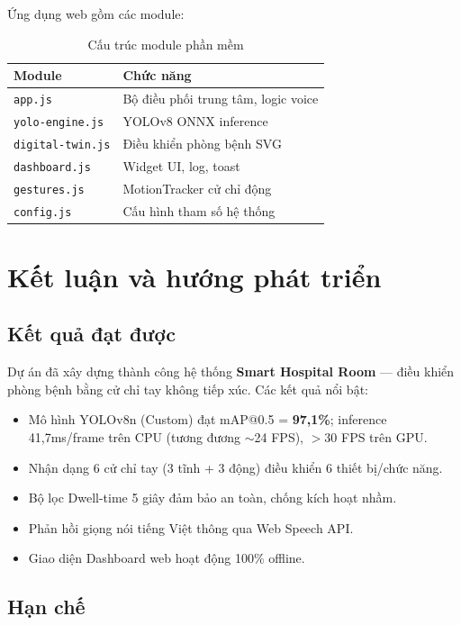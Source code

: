 \documentclass[conference]{IEEEtran}
\begin{document}
Ứng dụng web gồm các module:

\begin{table}[h]
\centering
\caption{Cấu trúc module phần mềm}
\label{tab:modules}
\begin{tabular}{l|l}
\hline
\textbf{Module} & \textbf{Chức năng} \\
\hline
\texttt{app.js} & Bộ điều phối trung tâm, logic voice \\
\texttt{yolo-engine.js} & YOLOv8 ONNX inference \\
\texttt{digital-twin.js} & Điều khiển phòng bệnh SVG \\
\texttt{dashboard.js} & Widget UI, log, toast \\
\texttt{gestures.js} & MotionTracker cử chỉ động \\
\texttt{config.js} & Cấu hình tham số hệ thống \\
\hline
\end{tabular}
\end{table}

\section{Kết luận và hướng phát triển}

\subsection{Kết quả đạt được}

Dự án đã xây dựng thành công hệ thống \textbf{Smart Hospital Room} --- điều khiển phòng bệnh bằng cử chỉ tay không tiếp xúc. Các kết quả nổi bật:

\begin{itemize}[noitemsep]
    \item Mô hình YOLOv8n (Custom) đạt mAP@0.5 = \textbf{97,1\%}; inference 41,7ms/frame trên CPU (tương đương $\sim$24 FPS), $>$30 FPS trên GPU.
    \item Nhận dạng 6 cử chỉ tay (3 tĩnh + 3 động) điều khiển 6 thiết bị/chức năng.
    \item Bộ lọc Dwell-time 5 giây đảm bảo an toàn, chống kích hoạt nhầm.
    \item Phản hồi giọng nói tiếng Việt thông qua Web Speech API.
    \item Giao diện Dashboard web hoạt động 100\% offline.
\end{itemize}

\subsection{Hạn chế}
\end{document}
